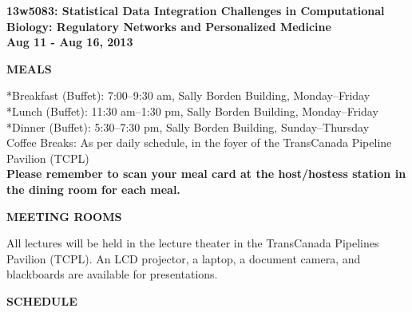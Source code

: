 \documentclass[11pt]{article}
\begin{document}
\begin{center}

\Large{\bf 13w5083: Statistical Data Integration Challenges in Computational Biology: Regulatory Networks and Personalized Medicine}\\
\Large{\bf Aug 11 - Aug 16, 2013}\\
\end{center}

\begin{center}
{\bf MEALS}
\end{center}

\noindent
*Breakfast (Buffet): 7:00--9:30 am, Sally Borden Building, Monday--Friday\\
*Lunch (Buffet): 11:30 am--1:30 pm, Sally Borden Building, Monday--Friday\\
*Dinner (Buffet): 5:30--7:30 pm, Sally Borden Building, Sunday--Thursday\\
Coffee Breaks:  As per daily schedule, in the foyer of the TransCanada Pipeline Pavilion (TCPL)\\	
{\bf *Please remember to scan your meal card at the host/hostess
station in the dining room for each meal.}

\begin{center}
{\bf MEETING ROOMS}
\end{center}

\noindent
All lectures will be held in the lecture theater in the TransCanada Pipelines Pavilion (TCPL). An LCD projector, a laptop, a document camera, and blackboards are available for presentations.

\begin{center}
{\bf SCHEDULE}
\end{center}

%
%
\end{document}
